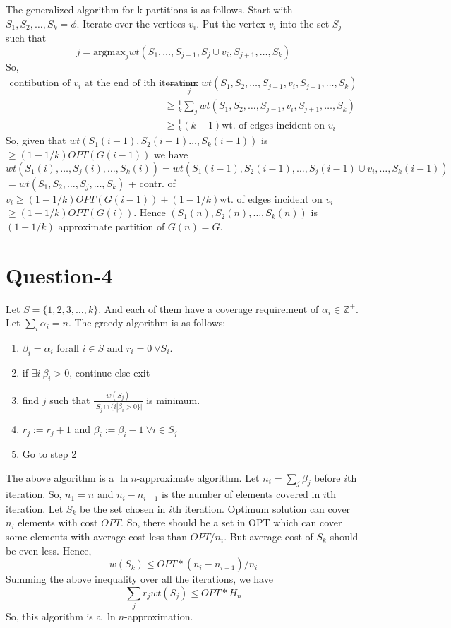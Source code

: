 \documentclass{article}
\newcommand{\set}[1]{\{#1\}}
\begin{document}
The generalized algorithm for k partitions is as follows. Start with $S_1,S_2,\ldots,S_k = \phi$. Iterate over the vertices $v_i$. Put the vertex $v_i$ into the set $S_j$ such that
\begin{equation}
    j = \text{argmax}_j wt(S_1,\ldots,S_{j-1},S_j \cup v_i, S_{j+1},\ldots,S_k)
\end{equation}
So,
\begin{align}
    \text{contibution of $v_i$ at the end of ith iteration} &= \max_{j}wt(S_1,S_2,\ldots,S_{j-1},v_i,S_{j+1},\ldots,S_k) \\
    &\geq \frac{1}{k}\sum_{j}wt(S_1,S_2,\ldots,S_{j-1},v_i,S_{j+1},\ldots,S_k)\\
    &\geq \frac{1}{k}(k-1)\text{wt. of edges incident on }v_i
\end{align}
So, given that $wt(S_1(i-1),S_2(i-1)\ldots,S_k(i-1))$ is $\geq (1-1/k)OPT(G(i-1))$ we have $wt(S_1(i),\ldots,S_j(i),\ldots,S_k(i)) = wt(S_1(i-1),S_2(i-1),\ldots,S_j(i-1)\cup v_i,\ldots,S_k(i-1))$ $ = wt(S_1,S_2,\ldots,S_j,\ldots,S_k)$ + contr. of $v_i \geq (1-1/k)OPT(G(i-1)) + (1-1/k)$wt. of edges incident on $v_i$ $\geq (1-1/k)OPT(G(i))$.
Hence $(S_1(n),S_2(n),\ldots,S_k(n))$ is $(1-1/k)$ approximate partition of $G(n) = G$.
\section{Question-4}
Let $S = \set{1,2,3,\ldots,k}$. And each of them have a coverage requirement of $\alpha_i \in \mathbb{Z}^+$. Let $\sum_{i}\alpha_i = n$. The greedy algorithm is as follows:
\begin{enumerate}
    \item $\beta_i = \alpha_i$ forall $i \in S$ and $r_i = 0\ \forall S_i$.
    \item if $\exists i\ \beta_i > 0$, continue else exit
    \item find $j$ such that $\frac{w(S_j)}{|S_j \cap \set{i|\beta_i > 0}|}$ is minimum.
    \item $r_j := r_j + 1$ and $\beta_i := \beta_i - 1\ \forall i \in S_j$
    \item Go to step 2
\end{enumerate}

The above algorithm is a $\ln n$-approximate algorithm. Let $n_i = \sum_j \beta_j$ before $i$th iteration. So, $n_1 = n$ and $n_{i} - n_{i+1}$ is the number of elements covered in $i$th iteration. Let $S_k$ be the set chosen in $i$th iteration. Optimum solution can cover $n_i$ elements with cost $OPT$. So, there should be a set in OPT which can cover some elements with average cost less than $OPT/n_i$. But average cost of $S_k$ should be even less. Hence,
\begin{equation}
    w(S_k) \leq OPT * (n_{i} - n_{i+1})/n_i
\end{equation}
Summing the above inequality over all the iterations, we have
\begin{equation}
    \sum_{j}r_jwt(S_j) \leq OPT*H_n
\end{equation}
So, this algorithm is a $\ln n$-approximation.
\end{document}
